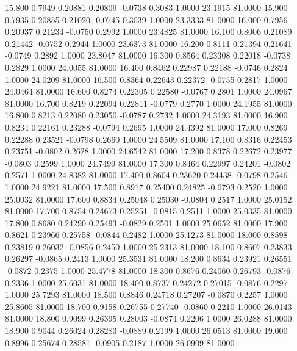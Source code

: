   15.800   0.7949   0.20881   0.20809  -0.0738   0.3083   1.0000  23.1915  81.0000
  15.900   0.7935   0.20855   0.21020  -0.0745   0.3039   1.0000  23.3333  81.0000
  16.000   0.7956   0.20937   0.21234  -0.0750   0.2992   1.0000  23.4825  81.0000
  16.100   0.8006   0.21089   0.21442  -0.0752   0.2944   1.0000  23.6373  81.0000
  16.200   0.8111   0.21394   0.21641  -0.0749   0.2892   1.0000  23.8047  81.0000
  16.300   0.8564   0.23308   0.22018  -0.0738   0.2829   1.0000  24.0055  81.0000
  16.400   0.8462   0.22987   0.22188  -0.0746   0.2824   1.0000  24.0209  81.0000
  16.500   0.8364   0.22643   0.22372  -0.0755   0.2817   1.0000  24.0464  81.0000
  16.600   0.8274   0.22305   0.22580  -0.0767   0.2801   1.0000  24.0967  81.0000
  16.700   0.8219   0.22094   0.22811  -0.0779   0.2770   1.0000  24.1955  81.0000
  16.800   0.8213   0.22080   0.23050  -0.0787   0.2732   1.0000  24.3193  81.0000
  16.900   0.8234   0.22161   0.23288  -0.0794   0.2695   1.0000  24.4392  81.0000
  17.000   0.8269   0.22288   0.23521  -0.0798   0.2660   1.0000  24.5509  81.0000
  17.100   0.8316   0.22453   0.23751  -0.0802   0.2628   1.0000  24.6542  81.0000
  17.200   0.8378   0.22672   0.23977  -0.0803   0.2599   1.0000  24.7499  81.0000
  17.300   0.8464   0.22997   0.24201  -0.0802   0.2571   1.0000  24.8382  81.0000
  17.400   0.8604   0.23620   0.24438  -0.0798   0.2546   1.0000  24.9221  81.0000
  17.500   0.8917   0.25400   0.24825  -0.0793   0.2520   1.0000  25.0032  81.0000
  17.600   0.8834   0.25048   0.25030  -0.0804   0.2517   1.0000  25.0152  81.0000
  17.700   0.8754   0.24673   0.25251  -0.0815   0.2511   1.0000  25.0335  81.0000
  17.800   0.8680   0.24290   0.25493  -0.0829   0.2501   1.0000  25.0652  81.0000
  17.900   0.8621   0.23966   0.25758  -0.0844   0.2482   1.0000  25.1273  81.0000
  18.000   0.8598   0.23819   0.26032  -0.0856   0.2450   1.0000  25.2313  81.0000
  18.100   0.8607   0.23833   0.26297  -0.0865   0.2413   1.0000  25.3531  81.0000
  18.200   0.8634   0.23921   0.26551  -0.0872   0.2375   1.0000  25.4778  81.0000
  18.300   0.8676   0.24060   0.26793  -0.0876   0.2336   1.0000  25.6031  81.0000
  18.400   0.8737   0.24272   0.27015  -0.0876   0.2297   1.0000  25.7293  81.0000
  18.500   0.8846   0.24718   0.27207  -0.0870   0.2257   1.0000  25.8605  81.0000
  18.700   0.9158   0.26755   0.27740  -0.0860   0.2210   1.0000  26.0143  81.0000
  18.800   0.9099   0.26395   0.28003  -0.0874   0.2206   1.0000  26.0288  81.0000
  18.900   0.9044   0.26024   0.28283  -0.0889   0.2199   1.0000  26.0513  81.0000
  19.000   0.8996   0.25674   0.28581  -0.0905   0.2187   1.0000  26.0909  81.0000
